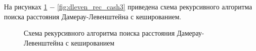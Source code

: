 
На рисунках \ref{fig:dleven_rec_cash1} $-$ \ref{fig:dleven_rec_cash3} приведена схема рекурсивного алгоритма поиска расстояния Дамерау-Левенштейна с кешированием.

\begin{figure}[h!]
	
		
		\caption{Схема рекурсивного алгоритма поиска расстояния Дамерау-Левенштейна с кешированием}
		
		\label{fig:dleven_rec_cash1}
		
	\end{figure}


